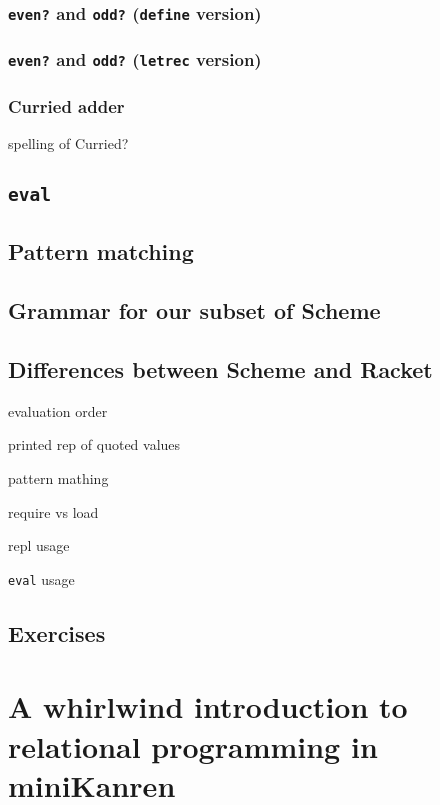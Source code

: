 \documentclass{book}
\begin{document}
\subsection{\texttt{even?} and \texttt{odd?} (\texttt{define} version)}

\subsection{\texttt{even?} and \texttt{odd?} (\texttt{letrec} version)}

\subsection{Curried adder}

spelling of Curried?

\section{\texttt{eval}}

\section{Pattern matching}

\section{Grammar for our subset of Scheme}

\section{Differences between Scheme and Racket}

evaluation order

printed rep of quoted values

pattern mathing

require vs load

repl usage

\verb|eval| usage

\section{Exercises}



\chapter{A whirlwind introduction to relational programming in miniKanren}%
\end{document}
